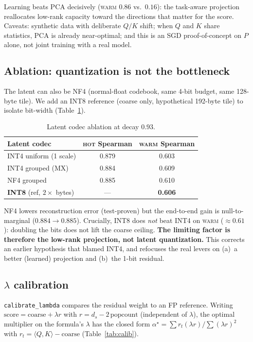 \documentclass[11pt]{article}
\theoremstyle{plain}
\theoremstyle{definition}
\newcommand{\ds}{d_s}
\newcommand{\inner}[2]{\langle #1, #2 \rangle}
\newcommand{\popc}{\mathrm{popcount}}
\begin{document}
Learning beats PCA decisively (\textsc{warm} $0.86$ vs.\ $0.16$): the
task-aware projection reallocates low-rank capacity toward the directions
that matter for the score. Caveats: synthetic data with deliberate $Q/K$
shift; when $Q$ and $K$ share statistics, PCA is already near-optimal;
and this is an SGD proof-of-concept on $P$ alone, not joint training with
a real model.

\subsection{Ablation: quantization is not the bottleneck}
\label{sec:ablation}
The latent can also be NF4 (normal-float codebook, same 4-bit budget,
same 128-byte tile). We add an INT8 reference (coarse only, hypothetical
192-byte tile) to isolate bit-width (Table~\ref{tab:ablation}).

\begin{table}[t]
\centering
\caption{Latent codec ablation at decay $0.93$.}
\label{tab:ablation}
\small
\begin{tabular}{@{}lcc@{}}
\toprule
Latent codec & \textsc{hot} Spearman & \textsc{warm} Spearman \\
\midrule
INT4 uniform (1 scale) & 0.879 & 0.603 \\
INT4 grouped (MX)      & 0.884 & 0.609 \\
NF4 grouped            & 0.885 & 0.610 \\
\textbf{INT8} (ref, $2\times$ bytes) & --- & \textbf{0.606} \\
\bottomrule
\end{tabular}
\end{table}

NF4 lowers reconstruction error (test-proven) but the end-to-end gain is
null-to-marginal ($0.884 \to 0.885$). Crucially, INT8 does \emph{not}
beat INT4 on \textsc{warm} ($\approx 0.61$): doubling the bits does not
lift the coarse ceiling. \textbf{The limiting factor is therefore the
low-rank projection, not latent quantization.} This corrects an earlier
hypothesis that blamed INT4, and refocuses the real levers on (a)~a
better (learned) projection and (b)~the 1-bit residual.

\subsection{$\lambda$ calibration}
\label{sec:calib}
\texttt{calibrate\_lambda} compares the residual weight to an FP
reference. Writing $\text{score} = \text{coarse} + \lambda r$ with
$r = \ds - 2\,\popc$ (independent of $\lambda$), the optimal multiplier
on the formula's $\lambda$ has the closed form
$\alpha^\star = \sum r_t (\lambda r) / \sum (\lambda r)^2$ with
$r_t = \inner{Q}{K} - \text{coarse}$ (Table~\ref{tab:calib}).
\end{document}

